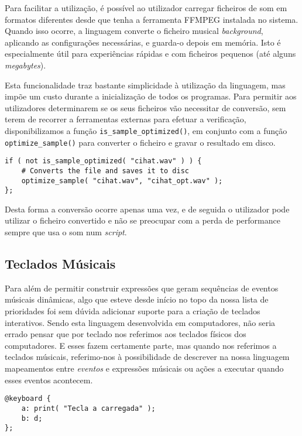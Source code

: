 Para facilitar a utilização, é possível ao utilizador carregar ficheiros de som em formatos diferentes desde que tenha a ferramenta FFMPEG instalada no sistema. Quando isso ocorre, a linguagem converte o ficheiro musical \textit{background}, aplicando as configurações necessárias, e guarda-o depois em memória. Isto é especialmente útil para experiências rápidas e com ficheiros pequenos (até alguns \textit{megabytes}).

Esta funcionalidade traz bastante simplicidade à utilização da linguagem, mas impõe um custo durante a inicialização de todos os programas. Para permitir aos utilizadores determinarem se os seus ficheiros vão necessitar de conversão, sem terem de recorrer a ferramentas externas para efetuar a verificação, disponibilizamos a função \texttt{is\_sample\_optimized()}, em conjunto com a função \texttt{optimize\_sample()} para converter o ficheiro e gravar o resultado em disco.

\begin{lstlisting}[caption={Verificar se um ficheiro de audio está optimizado, e convertê-lo caso contrário}]
if ( not is_sample_optimized( "cihat.wav" ) ) {
    # Converts the file and saves it to disc
    optimize_sample( "cihat.wav", "cihat_opt.wav" );
};
\end{lstlisting}

Desta forma a conversão ocorre apenas uma vez, e de seguida o utilizador pode utilizar o ficheiro convertido e não se preocupar com a perda de performance sempre que usa o som num \textit{script}.

\subsection{Teclados Músicais}
Para além de permitir construir expressões que geram sequências de eventos músicais dinâmicas, algo que esteve desde início no topo da nossa lista de prioridades foi sem dúvida adicionar suporte para a criação de teclados interativos. Sendo esta linguagem desenvolvida em computadores, não seria errado pensar que por teclado nos referimos aos teclados físicos dos computadores. E esses fazem certamente parte, mas quando nos referimos a teclados músicais, referimo-nos à possibilidade de descrever na nossa linguagem mapeamentos entre \textit{eventos} e expressões músicais ou ações a executar quando esses eventos acontecem.

\begin{lstlisting}[caption={Exemplo de declaração de duas teclas}]
@keyboard {
    a: print( "Tecla a carregada" );
    b: d;
};
\end{lstlisting}

